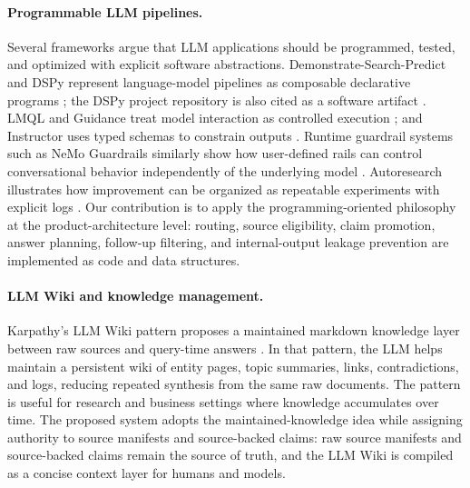 \paragraph{Programmable LLM pipelines.}
Several frameworks argue that LLM applications should be programmed, tested, and optimized with explicit software abstractions. Demonstrate-Search-Predict and DSPy represent language-model pipelines as composable declarative programs \citep{khattab2022demonstrate,khattab2024dspy}; the DSPy project repository is also cited as a software artifact \citep{stanfordnlp2026dspysoftware}. LMQL and Guidance treat model interaction as controlled execution \citep{beurerkellner2023lmql,guidance2026software}; and Instructor uses typed schemas to constrain outputs \citep{instructor2026software}. Runtime guardrail systems such as NeMo Guardrails similarly show how user-defined rails can control conversational behavior independently of the underlying model \citep{rebedea2023nemo}. Autoresearch illustrates how improvement can be organized as repeatable experiments with explicit logs \citep{karpathy2026autoresearch}. Our contribution is to apply the programming-oriented philosophy at the product-architecture level: routing, source eligibility, claim promotion, answer planning, follow-up filtering, and internal-output leakage prevention are implemented as code and data structures.

\paragraph{LLM Wiki and knowledge management.}
Karpathy's LLM Wiki pattern proposes a maintained markdown knowledge layer between raw sources and query-time answers \citep{karpathy2026llmwiki}. In that pattern, the LLM helps maintain a persistent wiki of entity pages, topic summaries, links, contradictions, and logs, reducing repeated synthesis from the same raw documents. The pattern is useful for research and business settings where knowledge accumulates over time. The proposed system adopts the maintained-knowledge idea while assigning authority to source manifests and source-backed claims: raw source manifests and source-backed claims remain the source of truth, and the LLM Wiki is compiled as a concise context layer for humans and models.

